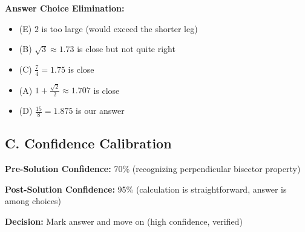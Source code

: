 \documentclass[12pt]{article}
\begin{document}
\begin{verificationbox}
\textbf{Answer Choice Elimination:}
\begin{itemize}
    \item (E) $2$ is too large (would exceed the shorter leg)
    \item (B) $\sqrt{3} \approx 1.73$ is close but not quite right
    \item (C) $\frac{7}{4} = 1.75$ is close
    \item (A) $1 + \frac{\sqrt{2}}{2} \approx 1.707$ is close
    \item (D) $\frac{15}{8} = 1.875$ is our answer
\end{itemize}

\subsection*{C. Confidence Calibration}

\textbf{Pre-Solution Confidence:} 70\% (recognizing perpendicular bisector property)

\textbf{Post-Solution Confidence:} 95\% (calculation is straightforward, answer is among choices)

\textbf{Decision:} Mark answer and move on (high confidence, verified)
\end{verificationbox}
\end{document}
